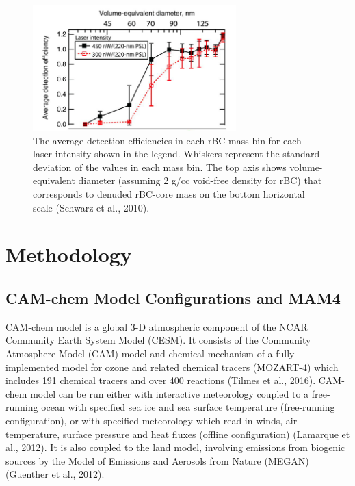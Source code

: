 \documentclass[12pt]{article}
\begin{document}
		 \begin{figure}[H] 
		 	\begin{center}
		 		\includegraphics[width = 0.7\textwidth]{Figure08}
		 		\caption[]{\label{fig_P8} The average detection efficiencies in each rBC mass-bin for each laser intensity shown in the legend. Whiskers represent the standard deviation of the values in each mass bin. The top axis shows volume-equivalent diameter (assuming 2 g/cc void-free density for rBC) that corresponds to denuded rBC-core mass on the bottom horizontal scale (Schwarz et al., 2010).}
		 	\end{center}
		 \end{figure}
	
	
	\newpage
	\section{Methodology}

		\subsection{CAM-chem Model Configurations and MAM4}
		
		CAM-chem model is a global 3-D atmospheric component of the NCAR Community Earth System Model (CESM). It consists of the Community Atmosphere Model (CAM) model and chemical mechanism of a fully implemented model for ozone and related chemical tracers (MOZART-4) which includes 191 chemical tracers and over 400 reactions (Tilmes et al., 2016). CAM-chem model can be run either with interactive meteorology coupled to a free-running ocean with specified sea ice and sea surface temperature (free-running configuration), or with specified meteorology which read in winds, air temperature, surface pressure and heat fluxes (offline configuration) (Lamarque et al., 2012). It is also coupled to the land model, involving emissions from biogenic sources by the Model of Emissions and Aerosols from Nature (MEGAN) (Guenther et al., 2012). 
\end{document}
